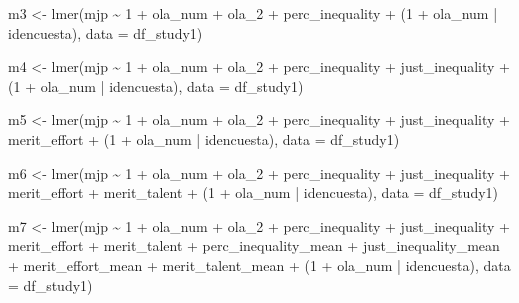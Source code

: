 \documentclass[
  12pt,
  letterpaper,
  DIV=11,
  numbers=noendperiod]{scrartcl}
\newenvironment{Shaded}{\begin{snugshade}}{\end{snugshade}}
\newcommand{\AttributeTok}[1]{\textcolor[rgb]{0.40,0.45,0.13}{#1}}
\newcommand{\DecValTok}[1]{\textcolor[rgb]{0.68,0.00,0.00}{#1}}
\newcommand{\FunctionTok}[1]{\textcolor[rgb]{0.28,0.35,0.67}{#1}}
\newcommand{\NormalTok}[1]{\textcolor[rgb]{0.00,0.23,0.31}{#1}}
\newcommand{\OtherTok}[1]{\textcolor[rgb]{0.00,0.23,0.31}{#1}}
\newcommand{\SpecialCharTok}[1]{\textcolor[rgb]{0.37,0.37,0.37}{#1}}
\begin{document}
\begin{Shaded}
\begin{Highlighting}[]
\NormalTok{m3 }\OtherTok{\textless{}{-}} \FunctionTok{lmer}\NormalTok{(mjp }\SpecialCharTok{\textasciitilde{}} \DecValTok{1} \SpecialCharTok{+}\NormalTok{ ola\_num }\SpecialCharTok{+}\NormalTok{ ola\_2 }\SpecialCharTok{+}\NormalTok{ perc\_inequality }\SpecialCharTok{+}\NormalTok{ (}\DecValTok{1} \SpecialCharTok{+}\NormalTok{ ola\_num }\SpecialCharTok{|}\NormalTok{ idencuesta), }
           \AttributeTok{data =}\NormalTok{ df\_study1)}

\NormalTok{m4 }\OtherTok{\textless{}{-}} \FunctionTok{lmer}\NormalTok{(mjp }\SpecialCharTok{\textasciitilde{}} \DecValTok{1} \SpecialCharTok{+}\NormalTok{ ola\_num }\SpecialCharTok{+}\NormalTok{ ola\_2 }\SpecialCharTok{+}\NormalTok{ perc\_inequality }\SpecialCharTok{+}\NormalTok{ just\_inequality }\SpecialCharTok{+}\NormalTok{ (}\DecValTok{1} \SpecialCharTok{+}\NormalTok{ ola\_num }\SpecialCharTok{|}\NormalTok{ idencuesta),}
                \AttributeTok{data =}\NormalTok{ df\_study1)}

\NormalTok{m5 }\OtherTok{\textless{}{-}} \FunctionTok{lmer}\NormalTok{(mjp }\SpecialCharTok{\textasciitilde{}} \DecValTok{1} \SpecialCharTok{+}\NormalTok{ ola\_num }\SpecialCharTok{+}\NormalTok{ ola\_2 }\SpecialCharTok{+}\NormalTok{ perc\_inequality }\SpecialCharTok{+}\NormalTok{ just\_inequality }\SpecialCharTok{+}\NormalTok{ merit\_effort }\SpecialCharTok{+}\NormalTok{ (}\DecValTok{1} \SpecialCharTok{+}\NormalTok{ ola\_num }\SpecialCharTok{|}\NormalTok{ idencuesta),}
                \AttributeTok{data =}\NormalTok{ df\_study1)}

\NormalTok{m6 }\OtherTok{\textless{}{-}} \FunctionTok{lmer}\NormalTok{(mjp }\SpecialCharTok{\textasciitilde{}} \DecValTok{1} \SpecialCharTok{+}\NormalTok{ ola\_num }\SpecialCharTok{+}\NormalTok{ ola\_2 }\SpecialCharTok{+}\NormalTok{ perc\_inequality }\SpecialCharTok{+}\NormalTok{ just\_inequality }\SpecialCharTok{+}\NormalTok{ merit\_effort }\SpecialCharTok{+}\NormalTok{ merit\_talent }\SpecialCharTok{+}\NormalTok{ (}\DecValTok{1} \SpecialCharTok{+}\NormalTok{ ola\_num }\SpecialCharTok{|}\NormalTok{ idencuesta),}
                \AttributeTok{data =}\NormalTok{ df\_study1)}


\NormalTok{m7 }\OtherTok{\textless{}{-}} \FunctionTok{lmer}\NormalTok{(mjp }\SpecialCharTok{\textasciitilde{}} \DecValTok{1} \SpecialCharTok{+}\NormalTok{ ola\_num }\SpecialCharTok{+}\NormalTok{ ola\_2 }\SpecialCharTok{+}\NormalTok{ perc\_inequality }\SpecialCharTok{+}\NormalTok{ just\_inequality }\SpecialCharTok{+}\NormalTok{ merit\_effort }\SpecialCharTok{+}\NormalTok{ merit\_talent }\SpecialCharTok{+}\NormalTok{ perc\_inequality\_mean }\SpecialCharTok{+}\NormalTok{ just\_inequality\_mean }\SpecialCharTok{+}\NormalTok{ merit\_effort\_mean }\SpecialCharTok{+}\NormalTok{ merit\_talent\_mean }\SpecialCharTok{+}\NormalTok{ (}\DecValTok{1} \SpecialCharTok{+}\NormalTok{ ola\_num }\SpecialCharTok{|}\NormalTok{ idencuesta),}
                \AttributeTok{data =}\NormalTok{ df\_study1)}


\end{Highlighting}
\end{Shaded}
\end{document}
